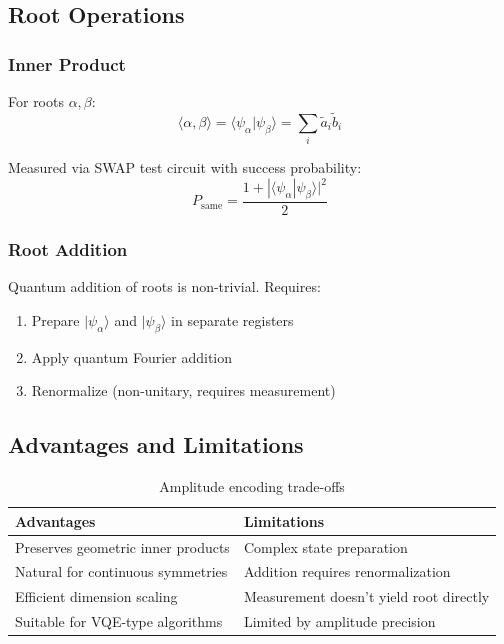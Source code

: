 \subsection{Root Operations}

\subsubsection{Inner Product}

For roots $\alpha, \beta$:
\begin{equation}
\langle \alpha, \beta \rangle = \langle \psi_\alpha | \psi_\beta \rangle = \sum_i \tilde{a}_i \tilde{b}_i
\end{equation}

Measured via SWAP test circuit with success probability:
\begin{equation}
P_{\text{same}} = \frac{1 + |\langle \psi_\alpha | \psi_\beta \rangle|^2}{2}
\end{equation}

\subsubsection{Root Addition}

Quantum addition of roots is non-trivial. Requires:
\begin{enumerate}
    \item Prepare $|\psi_\alpha\rangle$ and $|\psi_\beta\rangle$ in separate registers
    \item Apply quantum Fourier addition
    \item Renormalize (non-unitary, requires measurement)
\end{enumerate}

\subsection{Advantages and Limitations}

\begin{table}[h]
\centering
\begin{tabular}{p{6cm}p{6cm}}
\toprule
\textbf{Advantages} & \textbf{Limitations} \\
\midrule
Preserves geometric inner products & Complex state preparation \\
Natural for continuous symmetries & Addition requires renormalization \\
Efficient dimension scaling & Measurement doesn't yield root directly \\
Suitable for VQE-type algorithms & Limited by amplitude precision \\
\bottomrule
\end{tabular}
\caption{Amplitude encoding trade-offs}
\label{tab:amplitude_encoding_tradeoffs}
\end{table}

